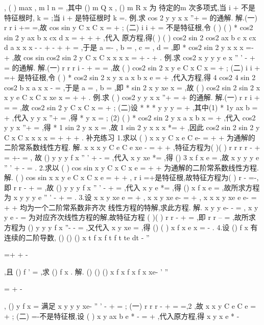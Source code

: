 ,
(
)
max
,
m
l n
=
,其中
()
m
Q
x ,
()
m
R
x 为 
待定的m 次多项式,当
i
\lambda 
\omega 
+
不是特征根时,
k =
;当
i
\lambda 
\omega 
+
是特征根时
k =. 
\textcolor{lyred}{例}.求
cos 2
y
y
x
x
''+
=
的通解. 
解.(一)
r
r
i
+=
\Rightarrow 
=\pm ,故
cos
sin
y
C
x
C
x
=
+
; 
(二)
i
i
\lambda 
\omega 
+
=
不是特征根,令
(
)
(
)
*
cos2
sin 2
y
ax
b
x
cx
d
x
=
+
+
+
,代入 
原方程,得(
)
(
)
cos2
sin 2
cos2
ax
b
c
x
cx
d
a
x
x
x
-
-
+
-
+
+
=
,于是 
a =-
,
b =
,
c =
,
d =
,即
*
cos2
sin 2
y
x
x
x
=-
+
,故 
cos
sin
cos2
sin 2
y
C
x
C
x
x
x
x
=
+
-
+
. 
\textcolor{lyred}{例}.求
cos2
x
y
y
y
e
x
''
'
-
+
=
的通解. 
解.(一)
r
r
r
i
-
+
=
\Rightarrow 
=\pm 
,故
(
)
cos2
sin 2
x
y
e
C
x
C
x
=
+
; 
(二)
i
i
\lambda 
\omega 
+
=+
是特征根,令
(
)
*
cos2
sin 2
x
y
x a
x
b
x e
=
+
,代入方程,得 
4 cos2
4 sin 2
cos2
b
x
a
x
x
-
=
,于是
a =
,
b =
,即
*
sin 2
x
y
xe
x
=
,故 
(
)
cos2
sin 2
sin 2
x
x
y
e
C
x
C
x
xe
x
=
+
+
. 
\textcolor{lyred}{例}.求
(
)
cos2
y
y
x
x
''+
=
+
的通解. 
解.(一)
r
r
i
+
=
\Rightarrow 
=\pm 
,故
cos2
sin 2
y
C
x
C
x
=
+
; 
(二)设
*
*
*
y
y
y
=
+
,其中(1)
*
1y
ax
b
=
+
,代入
y
y
x
''+
=
,得
*
y
x
=
; 
(2)
(
)
*
cos2
sin 2
y
x a
x
b
x
=
+
,代入
cos2
y
y
x
''+
=
,得
*
1 sin 2
y
x
x
=
,故 
1 sin 2
y
x
x
x
*=
+
,因此
cos2
sin 2
sin 2
y
C
x
C
x
x
x
x
=
+
+
+
. 
\textcolor{lyred}{补充练习 }
1.求以
(
)
x
x
y
C
x e
C e-
=
+
+
为通解的二阶常系数线性方程. 
解.
x
x
x
y
C e
C e
xe
-
=
+
+
,特征方程为(
)(
)
r
r
r
r
-
+
=
\Leftrightarrow 
+-
=
, 
故
()
y
y
y
f x
''
'
+
-
=
,代入
x
y
xe
*=
,得
()
3 x
f x
e
=
,故
x
y
y
y
e
''
'
+
-
=
. 
2.求以
(
)
cos
sin
x
y
C
x
C
x
e
=
+
+
为通解的二阶常系数线性方程. 
解.
(
)
cos
sin
x
x
y
e
C
x
C
x
e
=
+
+
,
r
i
=+是特征根,故特征方程为(
)
r -
=-,即 
r
r
-
+
=
,故
()
y
y
y
f x
''
'
-
+
=
,代入
x
y
e
*=
,得
()
x
f x
e
=
,故所求方程为 
x
y
y
y
e
''
'
-
+
=
. 
3.设
x
x
y
xe
e
=
+
,
x
x
y
xe
e-
=
+
,
x
x
x
y
xe
e
e-
=
+
+
均为一个二阶常系数非齐次 
线性方程的特解,求此方程. 
解.
x
y
y
e-
-
=
,
x
y
y
e
-
=
为对应齐次线性方程的解,故特征方程 
(
)(
)
r
r
-
+
=
,即
r
r
--
=
,故所求方程为
()
y
y
y
f x
''-
-
=
,又代入 
x
y
xe
=
,得
()
(
)
x
f x
e
x
=
-
. 
4.设
()
f x 有连续的二阶导数,
()
()
()
x
t
f x
f
t
f t
te
dt
-
''


=+
+
-


\int 
,且 
()
f '
=
,求
()
f x . 
解.
()
()
()
x
f
x
f
x
f x
xe-
'
''


=
+
-

,
()
y
f x
=
满足
x
y
y
y
xe-
''
'
-
+
=
; 
(一)
r
r
r
-
+
=
\Rightarrow 
=,2 ,故
x
x
y
C e
C e
=
+
; 
(二)
\lambda =-不是特征根,设
(
)
x
y
ax
b e
*
-
=
+
,代入原方程,得 
x
y
x
e
*
-


